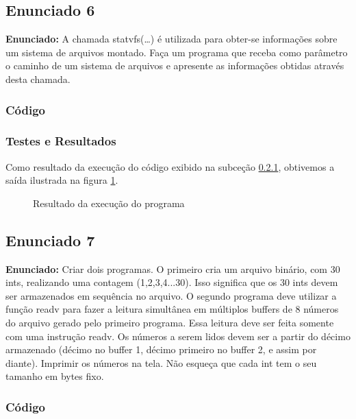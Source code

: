 \documentclass{article}
\begin{document}
\subsection{Enunciado 6}

\textbf{Enunciado:}  A chamada statvfs(…) é utilizada para obter-se informações sobre um sistema de arquivos montado. Faça um programa que receba como parâmetro o caminho de um sistema de arquivos e apresente as informações obtidas através desta chamada.\newline

\subsubsection{Código}
\label{sub-sec-cod}
%

\subsubsection{Testes e Resultados}
Como resultado da execução do código exibido na subceção \ref{sub-sec-cod}, obtivemos a saída ilustrada na figura \ref{fig:exec}. 

\begin{figure}[ht]
    \centering
    \caption{Resultado da execução do programa}
    \label{fig:exec}
\end{figure}

\subsection{Enunciado 7}

\textbf{Enunciado:}   Criar dois programas. O primeiro cria um arquivo binário, com 30 ints, realizando uma contagem (1,2,3,4...30). Isso significa que os 30 ints devem ser armazenados em sequência no arquivo. O segundo programa deve utilizar a função readv para fazer a leitura simultânea em múltiplos buffers de 8 números do arquivo gerado pelo primeiro programa. Essa leitura deve ser feita somente com uma instrução readv. Os números a serem lidos devem ser a partir do décimo armazenado (décimo no buffer 1, décimo primeiro no buffer 2, e assim por diante). Imprimir os números na tela. Não esqueça que cada int tem o seu tamanho em bytes fixo.\newline

\subsubsection{Código}
\label{sub-sec-cod}
%
\end{document}
